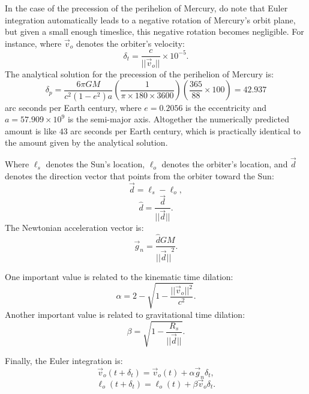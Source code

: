 \documentclass[12pt]{article}
\begin{document}
In the case of the precession of the perihelion of Mercury, do note that Euler integration automatically leads to a negative rotation of Mercury's orbit plane, but given a small enough timeslice, this negative rotation becomes negligible.
For instance, where $\vec{v}_{o}$ denotes the orbiter's velocity:
\begin{equation}
\delta_{t} = \frac{c}{\lvert\lvert \vec{v}_{o} \rvert \rvert} \times 10^{-5}.
\end{equation}
The analytical solution for the precession of the perihelion of Mercury is:
\begin{equation}
\delta_{p} = \frac{6 \pi G M}{c^2 (1 - e^2) a} \left( \frac{1}{ \pi \times 180 \times 3600} \right) \left( \frac{365}{88} \times 100 \right) = 42.937
\end{equation}
arc seconds per Earth century, where $e = 0.2056$ is the eccentricity and $a = 57.909 \times 10^9$ is the semi-major axis.
Altogether the numerically predicted amount is like $43$ arc seconds per Earth century, which is practically identical to the amount given by the analytical solution.

Where $\ell_s$ denotes the Sun's location, $\ell_o$ denotes the orbiter's location, and $\vec{d}$ denotes the direction vector that points from the orbiter toward the Sun:
\begin{equation}
\vec{d} = \ell_{s} - \ell_{o},	
\end{equation}
\begin{equation}
\hat{d} = \frac{\vec{d}}{\lvert\lvert \vec{d} \rvert\rvert}.
\end{equation}
The Newtonian acceleration vector is:
\begin{equation}
\vec{g}_n =  \frac{\hat{d} G M}{{\lvert\lvert \vec{d} \rvert\rvert}^2}.
\end{equation}

One important value is related to the kinematic time dilation:
\begin{equation}
\alpha = 2 - \sqrt{1 - \frac{\lvert\lvert \vec{v}_{o}\rvert\rvert^2}{c^2}}.
\end{equation}
Another important value is related to gravitational time dilation:
\begin{equation}
\beta = \sqrt{1 - \frac{R_{s}}{\lvert \lvert \vec{d} \rvert \rvert}}.
\end{equation}

Finally, the Euler integration is:
\begin{equation}
\vec{v}_{o}(t + \delta_t) = \vec{v}_{o}(t) + \alpha \vec{g}_n \delta_{t},
\end{equation}
\begin{equation}
\ell_{o}(t + \delta_t) = \ell_{o}(t) + \beta \vec{v}_{o} \delta_{t}.
\end{equation}
\end{document}
